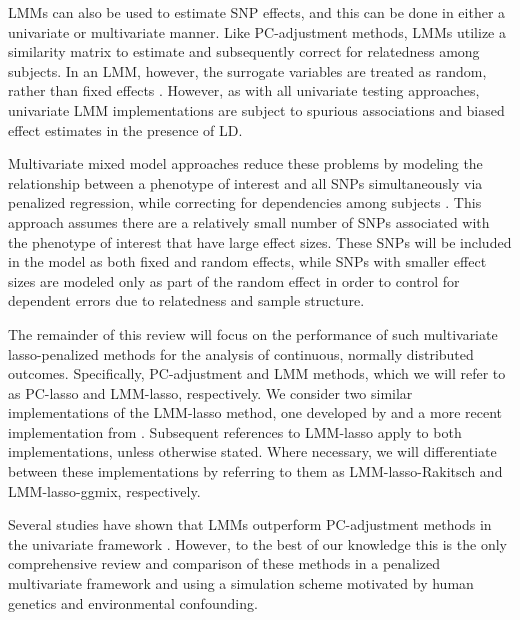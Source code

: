 LMMs can also be used to estimate SNP effects, and this can be done in either a univariate or multivariate manner. Like PC-adjustment methods, LMMs utilize a similarity matrix to estimate and subsequently correct for relatedness among subjects. In an LMM, however, the surrogate variables are treated as random, rather than fixed effects
\citep{yu2006unified, kang2010variance, kang2008efficient}. However, as with all univariate testing approaches, univariate LMM implementations are subject to spurious associations and biased effect estimates in the presence of LD. 

Multivariate mixed model approaches reduce these problems by modeling the relationship between a phenotype of interest and all SNPs simultaneously via penalized regression, while correcting for dependencies among subjects \citep{Rakitsch2012, bhatnagar2020simultaneous}. This approach assumes there are a relatively small number of SNPs associated with the phenotype of interest that have large effect sizes. These SNPs will be included in the model as both fixed and random effects, while SNPs with smaller effect sizes are modeled only as part of the random effect in order to control for dependent errors due to relatedness and sample structure. 

The remainder of this review will focus on the performance of such multivariate lasso-penalized methods for the analysis of continuous, normally distributed outcomes. Specifically, PC-adjustment and LMM methods, which we will refer to as PC-lasso and LMM-lasso, respectively. We consider two similar implementations of the LMM-lasso method, one developed by \citet{Rakitsch2012} and a more recent implementation from \citet{bhatnagar2020simultaneous}. Subsequent references to LMM-lasso apply to both implementations, unless otherwise stated. Where necessary, we will differentiate between these implementations by referring to them as LMM-lasso-Rakitsch and LMM-lasso-ggmix, respectively. 

Several studies have shown that LMMs outperform PC-adjustment methods in the univariate framework \citep{wang2013analytical, kang2010variance, zhao2007arabidopsis}. However, to the best of our knowledge this is the only comprehensive review and comparison of these methods in a penalized multivariate framework and using a simulation scheme motivated by human genetics and environmental confounding.\\

